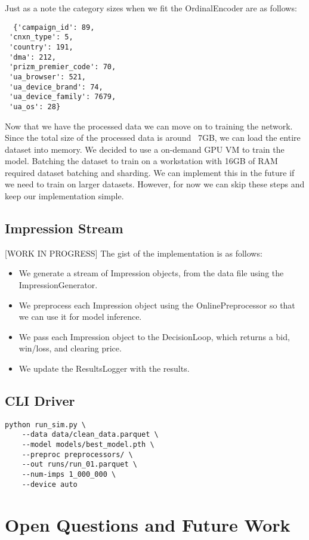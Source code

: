 \documentclass[11pt]{article}
\begin{document}
Just as a note the category sizes when we fit the OrdinalEncoder are as follows:
\begin{verbatim}
  {'campaign_id': 89,
 'cnxn_type': 5,
 'country': 191,
 'dma': 212,
 'prizm_premier_code': 70,
 'ua_browser': 521,
 'ua_device_brand': 74,
 'ua_device_family': 7679,
 'ua_os': 28}
\end{verbatim}

Now that we have the processed data we can move on to training the network. Since the total size of the processed data is
around ~7GB, we can load the entire dataset into memory. We decided to use a on-demand GPU VM to train the model. Batching the
dataset to train on a workstation with 16GB of RAM required dataset batching and sharding. We can implement this in the future 
if we need to train on larger datasets. However, for now we can skip these steps and keep our implementation simple.


\subsection{Impression Stream}
[WORK IN PROGRESS]
The gist of the implementation is as follows:
\begin{itemize}
  \item We generate a stream of Impression objects, from the data file using the ImpressionGenerator.
  \item We preprocess each Impression object using the OnlinePreprocessor so that we can use it for model inference.
  \item We pass each Impression object to the DecisionLoop, which returns a bid, win/loss, and clearing price.
  \item We update the ResultsLogger with the results.
\end{itemize}

\subsection{CLI Driver}

\begin{verbatim}
python run_sim.py \
    --data data/clean_data.parquet \
    --model models/best_model.pth \
    --preproc preprocessors/ \
    --out runs/run_01.parquet \
    --num-imps 1_000_000 \
    --device auto
\end{verbatim}


\section{Open Questions and Future Work}\label{sec:openq}
\end{document}
